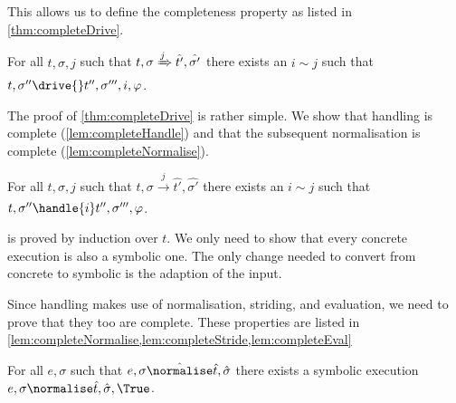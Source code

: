 This allows us to define the completeness property as listed in \cref{thm:completeDrive}.

%



\begin{theorem}
  \label{thm:completeDrive}
  For all $t,\sigma,j$ such that $t,\sigma \xRightarrow[]{j} \hat{t'},\hat{\sigma'}$
  there exists an $i\sim j$ such that $t,\sigma''\drive{} t'',\sigma''',i,\phi$.
\end{theorem}


The proof of \cref{thm:completeDrive} is rather simple.
We show that handling is complete (\cref{lem:completeHandle})
and that the subsequent normalisation is complete (\cref{lem:completeNormalise}).


\begin{lemma}
  \label{lem:completeHandle}
  For all $t,\sigma,j$ such that $t,\sigma \xrightarrow[]{j} \hat{t'},\hat{\sigma'}$
  there exists an $i\sim j$ such that $t,\sigma''\handle{i} t'',\sigma''',\phi$.
\end{lemma}

 is proved by induction over $t$.
We only need to show that every concrete execution is also a symbolic one.
The only change needed to convert from concrete to symbolic is the adaption of the input.

Since handling makes use of normalisation, striding, and evaluation, we need to prove that they too are complete.
These properties are listed in \cref{lem:completeNormalise,lem:completeStride,lem:completeEval}

\begin{lemma}
  \label{lem:completeNormalise}
  For all $e,\sigma$ such that $e,\sigma \hat{\normalise}\hat{t},\hat{\sigma}$
  there exists a symbolic execution $e,\sigma\normalise \hat{t},\hat{\sigma},\True$.
\end{lemma}

